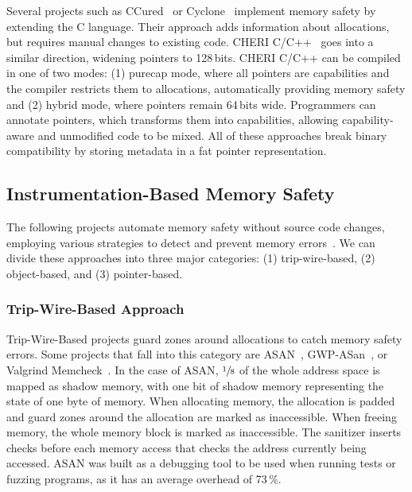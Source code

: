 Several projects such as CCured~\cite{necula2002ccured} or Cyclone~\cite{jim2002cyclone} implement memory safety by extending the C language.
Their approach adds information about allocations, but requires manual changes to existing code.
CHERI C/C++~\cite{watson_cheri_2020} goes into a similar direction, widening pointers to 128\,bits.
CHERI C/C++ can be compiled in one of two modes: (1) purecap mode, where all pointers are capabilities and the compiler restricts them to allocations, automatically providing memory safety and (2) hybrid mode, where pointers remain 64\,bits wide.
Programmers can annotate pointers, which transforms them into capabilities, allowing capability-aware and unmodified code to be mixed.
All of these approaches break binary compatibility by storing metadata in a fat pointer representation.

\subsection{Instrumentation-Based Memory Safety}
\label{subsec:automatic-approaches}

The following projects automate memory safety without source code changes, employing various strategies to detect and prevent memory errors~\cite{serebryany2012addresssanitizer,serebryany2023gwp,nethercote2007valgrind}.
We can divide these approaches into three major categories: (1) trip-wire-based, (2) object-based, and (3) pointer-based.

\subsubsection{Trip-Wire-Based Approach}

Trip-Wire-Based projects guard zones around allocations to catch memory safety errors.
Some projects that fall into this category are \ac{ASAN}~\cite{serebryany2012addresssanitizer}, GWP-ASan~\cite{serebryany2023gwp}, or Valgrind Memcheck~\cite{nethercote2007valgrind}.
In the case of \ac{ASAN}, $\sfrac{1}{8}$ of the whole address space is mapped as shadow memory, with one bit of shadow memory representing the state of one byte of memory.
When allocating memory, the allocation is padded and guard zones around the allocation are marked as inaccessible.
When freeing memory, the whole memory block is marked as inaccessible.
The sanitizer inserts checks before each memory access that checks the address currently being accessed.
\Ac{ASAN} was built as a debugging tool to be used when running tests or fuzzing programs, as it has an average overhead of 73\,\%.

